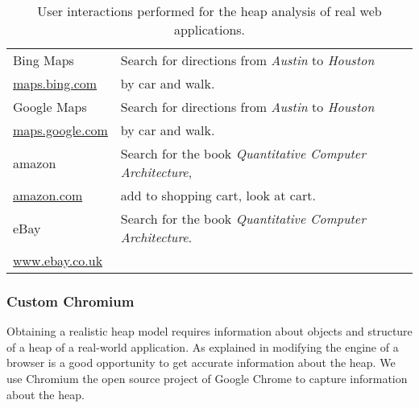 \begin{table}
\begin{tabular}{l l}
		Bing Maps 				& Search for directions from \textit{Austin} to \textit{Houston}		\\ 
		\url{maps.bing.com} 	& by car and walk. 														\\ \midrule

		Google Maps				& Search for directions from \textit{Austin} to \textit{Houston}		\\ 
		\url{maps.google.com} 	& by car and walk. 														\\ \midrule

		amazon 					& Search for the book \textit{Quantitative Computer Architecture},		\\ 
		\url{amazon.com} 		& add to shopping cart, look at cart. 									\\ \midrule

		eBay 					& Search for the book \textit{Quantitative Computer Architecture}. 		\\ 
		\url{www.ebay.co.uk} 	& 																		\\ \bottomrule

	\end{tabular}
	\caption{User interactions performed for the heap analysis of real web applications.}
	\label{tab:real_world_apps}
\end{table}


\subsubsection{Custom Chromium} \label{sec:custom_chromium}
Obtaining a realistic \JS heap model requires information about objects and structure of a heap of a real-world \JS application. As explained in \cite{JSMeter2009} modifying the \JS engine of a browser is a good opportunity to get accurate information about the \JS heap. We use Chromium \cite{Chromium} the open source project of Google Chrome \cite{Chrome} to capture information about the \JS heap.

